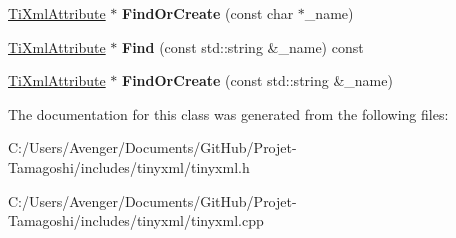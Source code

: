 \begin{DoxyCompactItemize}
\item 
\hypertarget{class_ti_xml_attribute_set_a5e28f5d32f048fba85d04dc317495bdc}{\hyperlink{class_ti_xml_attribute}{Ti\+Xml\+Attribute} $\ast$ {\bfseries Find\+Or\+Create} (const char $\ast$\+\_\+name)}\label{class_ti_xml_attribute_set_a5e28f5d32f048fba85d04dc317495bdc}

\item 
\hypertarget{class_ti_xml_attribute_set_ab6d6c98b99a257e38fec81cae36a54d1}{\hyperlink{class_ti_xml_attribute}{Ti\+Xml\+Attribute} $\ast$ {\bfseries Find} (const std\+::string \&\+\_\+name) const }\label{class_ti_xml_attribute_set_ab6d6c98b99a257e38fec81cae36a54d1}

\item 
\hypertarget{class_ti_xml_attribute_set_acccd76e3d87a92caed2795266c6e540e}{\hyperlink{class_ti_xml_attribute}{Ti\+Xml\+Attribute} $\ast$ {\bfseries Find\+Or\+Create} (const std\+::string \&\+\_\+name)}\label{class_ti_xml_attribute_set_acccd76e3d87a92caed2795266c6e540e}

\end{DoxyCompactItemize}


The documentation for this class was generated from the following files\+:\begin{DoxyCompactItemize}
\item 
C\+:/\+Users/\+Avenger/\+Documents/\+Git\+Hub/\+Projet-\/\+Tamagoshi/includes/tinyxml/tinyxml.\+h\item 
C\+:/\+Users/\+Avenger/\+Documents/\+Git\+Hub/\+Projet-\/\+Tamagoshi/includes/tinyxml/tinyxml.\+cpp\end{DoxyCompactItemize}
